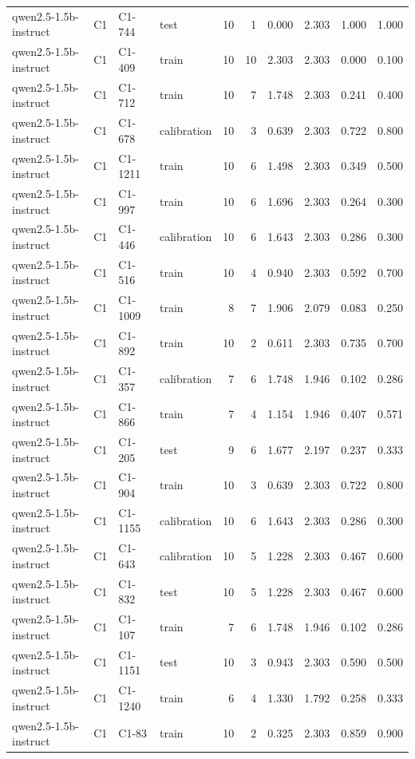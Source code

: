 \begin{table}
\begin{tabular}{llllrrrrrr}
qwen2.5-1.5b-instruct & C1 & C1-744 & test & 10 & 1 & 0.000 & 2.303 & 1.000 & 1.000 \\
qwen2.5-1.5b-instruct & C1 & C1-409 & train & 10 & 10 & 2.303 & 2.303 & 0.000 & 0.100 \\
qwen2.5-1.5b-instruct & C1 & C1-712 & train & 10 & 7 & 1.748 & 2.303 & 0.241 & 0.400 \\
qwen2.5-1.5b-instruct & C1 & C1-678 & calibration & 10 & 3 & 0.639 & 2.303 & 0.722 & 0.800 \\
qwen2.5-1.5b-instruct & C1 & C1-1211 & train & 10 & 6 & 1.498 & 2.303 & 0.349 & 0.500 \\
qwen2.5-1.5b-instruct & C1 & C1-997 & train & 10 & 6 & 1.696 & 2.303 & 0.264 & 0.300 \\
qwen2.5-1.5b-instruct & C1 & C1-446 & calibration & 10 & 6 & 1.643 & 2.303 & 0.286 & 0.300 \\
qwen2.5-1.5b-instruct & C1 & C1-516 & train & 10 & 4 & 0.940 & 2.303 & 0.592 & 0.700 \\
qwen2.5-1.5b-instruct & C1 & C1-1009 & train & 8 & 7 & 1.906 & 2.079 & 0.083 & 0.250 \\
qwen2.5-1.5b-instruct & C1 & C1-892 & train & 10 & 2 & 0.611 & 2.303 & 0.735 & 0.700 \\
qwen2.5-1.5b-instruct & C1 & C1-357 & calibration & 7 & 6 & 1.748 & 1.946 & 0.102 & 0.286 \\
qwen2.5-1.5b-instruct & C1 & C1-866 & train & 7 & 4 & 1.154 & 1.946 & 0.407 & 0.571 \\
qwen2.5-1.5b-instruct & C1 & C1-205 & test & 9 & 6 & 1.677 & 2.197 & 0.237 & 0.333 \\
qwen2.5-1.5b-instruct & C1 & C1-904 & train & 10 & 3 & 0.639 & 2.303 & 0.722 & 0.800 \\
qwen2.5-1.5b-instruct & C1 & C1-1155 & calibration & 10 & 6 & 1.643 & 2.303 & 0.286 & 0.300 \\
qwen2.5-1.5b-instruct & C1 & C1-643 & calibration & 10 & 5 & 1.228 & 2.303 & 0.467 & 0.600 \\
qwen2.5-1.5b-instruct & C1 & C1-832 & test & 10 & 5 & 1.228 & 2.303 & 0.467 & 0.600 \\
qwen2.5-1.5b-instruct & C1 & C1-107 & train & 7 & 6 & 1.748 & 1.946 & 0.102 & 0.286 \\
qwen2.5-1.5b-instruct & C1 & C1-1151 & test & 10 & 3 & 0.943 & 2.303 & 0.590 & 0.500 \\
qwen2.5-1.5b-instruct & C1 & C1-1240 & train & 6 & 4 & 1.330 & 1.792 & 0.258 & 0.333 \\
qwen2.5-1.5b-instruct & C1 & C1-83 & train & 10 & 2 & 0.325 & 2.303 & 0.859 & 0.900 \\

\end{tabular}
\end{table}
